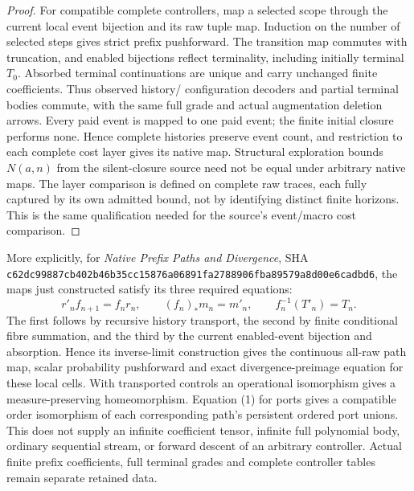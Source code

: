 \documentclass[11pt]{article}
\begin{document}
\begin{proof}
For compatible complete controllers, map a selected scope through the
current local event bijection and its raw tuple map. Induction on the
number of selected steps gives strict prefix pushforward. The transition
map commutes with truncation, and enabled bijections reflect terminality,
including initially terminal $T_0$. Absorbed terminal continuations are
unique and carry unchanged finite coefficients. Thus observed history/
configuration decoders and partial terminal bodies commute, with the
same full grade and actual augmentation deletion arrows.
Every paid event is mapped to one paid event; the finite initial closure
performs none. Hence complete histories preserve event count, and
restriction to each complete cost layer gives its native map. Structural
exploration bounds $N(a,n)$ from the silent-closure source need not be
equal under arbitrary native maps. The layer comparison is defined on
complete raw traces, each fully captured by its own admitted bound, not
by identifying distinct finite horizons. This is the same qualification
needed for the source's event/macro cost comparison.
\end{proof}

More explicitly, for \emph{Native Prefix Paths and Divergence}, SHA
\texttt{c62dc99887cb402b46b35cc15876a06891fa2788906fba89579a8d00e6cadbd6},
the maps just constructed satisfy its three required equations:
\[
 r'_n f_{n+1}=f_n r_n,\qquad (f_n)_*m_n=m'_n,\qquad
 f_n^{-1}(T'_n)=T_n.                                     \tag{5}
\]
The first follows by recursive history transport, the second by finite
conditional fibre summation, and the third by the current enabled-event
bijection and absorption. Hence its inverse-limit construction gives the
continuous all-raw path map, scalar probability pushforward and exact
divergence-preimage equation for these local cells. With transported
controls an operational isomorphism gives a measure-preserving
homeomorphism. Equation (1) for ports gives a compatible order isomorphism
of each corresponding path's persistent ordered port unions.
This does not supply an infinite coefficient tensor, infinite full
polynomial body, ordinary sequential stream, or forward descent of an
arbitrary controller. Actual finite prefix coefficients, full terminal
grades and complete controller tables remain separate retained data.
\end{document}
